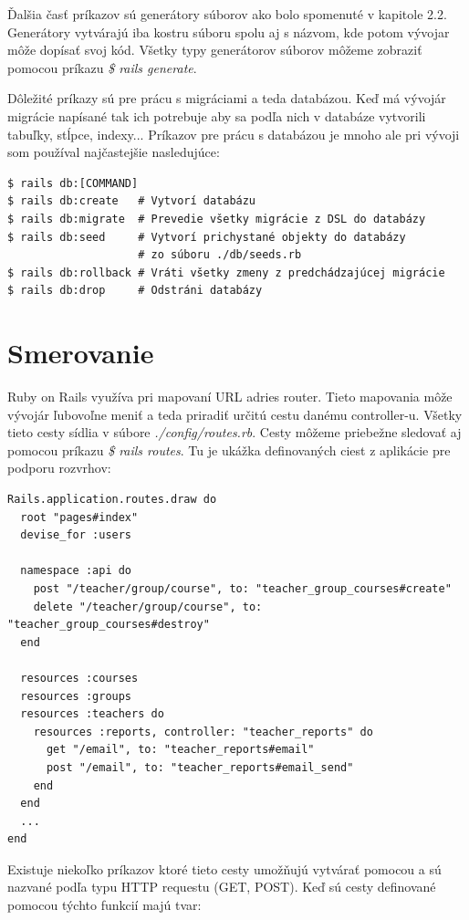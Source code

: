 Ďalšia časť príkazov sú generátory súborov ako bolo spomenuté v kapitole 2.2. Generátory vytvárajú iba kostru súboru spolu aj s názvom, kde potom vývojar môže dopísať svoj kód. Všetky typy generátorov súborov môžeme zobraziť pomocou príkazu \emph{\$ rails generate}.

Dôležité príkazy sú pre prácu s migráciami a teda databázou. Keď má vývojár migrácie napísané tak ich potrebuje aby sa podľa nich v databáze vytvorili tabuľky, stĺpce, indexy... Príkazov pre prácu s databázou je mnoho ale pri vývoji som používal najčastejšie nasledujúce:

\begin{verbatim}
$ rails db:[COMMAND]
$ rails db:create   # Vytvorí databázu
$ rails db:migrate  # Prevedie všetky migrácie z DSL do databázy
$ rails db:seed     # Vytvorí prichystané objekty do databázy
                    # zo súboru ./db/seeds.rb
$ rails db:rollback # Vráti všetky zmeny z predchádzajúcej migrácie
$ rails db:drop     # Odstráni databázy
\end{verbatim}

\section{Smerovanie}

Ruby on Rails využíva pri mapovaní URL adries router. Tieto mapovania môže vývojár ľubovoľne meniť a teda priradiť určitú cestu danému controller-u. Všetky tieto cesty sídlia v súbore \emph{./config/routes.rb}. Cesty môžeme priebežne sledovať aj pomocou príkazu \emph{\$ rails routes}. Tu je ukážka definovaných ciest z aplikácie pre podporu rozvrhov:

\begin{verbatim}
Rails.application.routes.draw do
  root "pages#index"
  devise_for :users

  namespace :api do
    post "/teacher/group/course", to: "teacher_group_courses#create"
    delete "/teacher/group/course", to: "teacher_group_courses#destroy"
  end

  resources :courses
  resources :groups
  resources :teachers do
    resources :reports, controller: "teacher_reports" do
      get "/email", to: "teacher_reports#email"
      post "/email", to: "teacher_reports#email_send"
    end
  end
  ...
end
\end{verbatim}

Existuje niekoľko príkazov ktoré tieto cesty umožňujú vytvárať pomocou a sú nazvané podľa typu HTTP requestu (GET, POST). Keď sú cesty definované pomocou týchto funkcií majú tvar:

